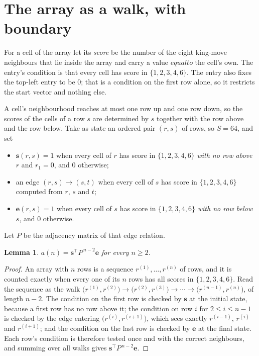 \documentclass[11pt,a4paper]{article}
\theoremstyle{plain}
\newtheorem{lemma}[theorem]{Lemma}
\theoremstyle{definition}
\begin{document}
\section{The array as a walk, with boundary}

For a cell of the array let its \emph{score} be the number of the eight king-move neighbours that lie inside
the array and carry a value $equal to$ the cell's own. The entry's condition is that every cell
has score in $\{1,2,3,4,6\}$. The entry also fixes the top-left entry to be $0$; that is a condition on the first row alone, so it restricts the start vector and nothing else.

A cell's neighbourhood reaches at most one row up and one row down, so the scores of the
cells of a row $s$ are determined by $s$ together with the row above and the row below.
Take as state an ordered pair $(r,s)$ of rows, so $S=64$, and set
\begin{itemize}
\item $\mathbf{s}(r,s)=1$ when every cell of $r$ has score in $\{1,2,3,4,6\}$ \emph{with no row
above $r$} and $r_1=0$, and $0$ otherwise;
\item an edge $(r,s)\to(s,t)$ when every cell of $s$ has score in $\{1,2,3,4,6\}$ computed from
$r$, $s$ and $t$;
\item $\mathbf{e}(r,s)=1$ when every cell of $s$ has score in $\{1,2,3,4,6\}$ \emph{with no row
below $s$}, and $0$ otherwise.
\end{itemize}
Let $P$ be the adjacency matrix of that edge relation.

\begin{lemma}\label{lem:walk}
$a(n)=\mathbf{s}^{\!\top}P^{\,n-2}\mathbf{e}$ for every $n\ge2$.
\end{lemma}

\begin{proof}
An array with $n$ rows is a sequence $r^{(1)},\dots,r^{(n)}$ of rows, and it is counted
exactly when every one of its $n$ rows has all scores in $\{1,2,3,4,6\}$. Read the sequence as the
walk $\bigl(r^{(1)},r^{(2)}\bigr)\to\bigl(r^{(2)},r^{(3)}\bigr)\to\cdots\to
\bigl(r^{(n-1)},r^{(n)}\bigr)$, of length $n-2$. The condition on the first row is
checked by $\mathbf{s}$ at the initial state, because a first row has no row above it; the
condition on row $i$ for $2\le i\le n-1$ is checked by the edge entering
$\bigl(r^{(i)},r^{(i+1)}\bigr)$, which sees exactly $r^{(i-1)}$, $r^{(i)}$ and
$r^{(i+1)}$; and the condition on the last row is checked by $\mathbf{e}$ at the final
state. Each row's condition is therefore tested once and with the correct neighbours, and
summing over all walks gives $\mathbf{s}^{\!\top}P^{\,n-2}\mathbf{e}$.
\end{proof}
\end{document}
